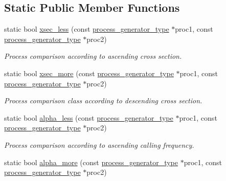 \subsection*{Static Public Member Functions}
\begin{DoxyCompactItemize}
\item 
\hypertarget{a00212_afcbf494bb9e50dbc2100b19e54cd7be2}{}static bool \hyperlink{a00212_afcbf494bb9e50dbc2100b19e54cd7be2}{xsec\+\_\+less} (const \hyperlink{a00436}{process\+\_\+generator\+\_\+type} $\ast$proc1, const \hyperlink{a00436}{process\+\_\+generator\+\_\+type} $\ast$proc2)\label{a00212_afcbf494bb9e50dbc2100b19e54cd7be2}

\begin{DoxyCompactList}\small\item\em Process comparison according to ascending cross section. \end{DoxyCompactList}\item 
\hypertarget{a00212_a9e312eb4bd2665eca54566290947b298}{}static bool \hyperlink{a00212_a9e312eb4bd2665eca54566290947b298}{xsec\+\_\+more} (const \hyperlink{a00436}{process\+\_\+generator\+\_\+type} $\ast$proc1, const \hyperlink{a00436}{process\+\_\+generator\+\_\+type} $\ast$proc2)\label{a00212_a9e312eb4bd2665eca54566290947b298}

\begin{DoxyCompactList}\small\item\em Process comparison class according to descending cross section. \end{DoxyCompactList}\item 
\hypertarget{a00212_ac02c6724818fc48ded0dfb6a574ac622}{}static bool \hyperlink{a00212_ac02c6724818fc48ded0dfb6a574ac622}{alpha\+\_\+less} (const \hyperlink{a00436}{process\+\_\+generator\+\_\+type} $\ast$proc1, const \hyperlink{a00436}{process\+\_\+generator\+\_\+type} $\ast$proc2)\label{a00212_ac02c6724818fc48ded0dfb6a574ac622}

\begin{DoxyCompactList}\small\item\em Process comparison according to ascending calling frequency. \end{DoxyCompactList}\item 
\hypertarget{a00212_a53a8c44182b72722a3a8713c1815c415}{}static bool \hyperlink{a00212_a53a8c44182b72722a3a8713c1815c415}{alpha\+\_\+more} (const \hyperlink{a00436}{process\+\_\+generator\+\_\+type} $\ast$proc1, const \hyperlink{a00436}{process\+\_\+generator\+\_\+type} $\ast$proc2)\label{a00212_a53a8c44182b72722a3a8713c1815c415}


\end{DoxyCompactItemize}
